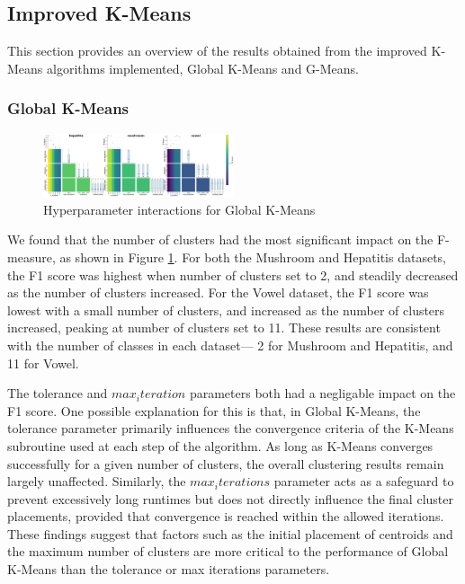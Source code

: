 \subsection{Improved K-Means}
\label{subsec:improvedkmeansresults}

This section provides an overview of the results obtained from the improved K-Means algorithms implemented, Global K-Means and G-Means.

\subsubsection{Global K-Means}
\label{subsec:globalkmeansresults}

\begin{figure}[h!]
    \centering
    \includegraphics[width=0.5\textwidth]{figures/interactions_global_kmeans.png}
    \caption{Hyperparameter interactions for Global K-Means}
    \label{fig:interactions-global-kmeans}
\end{figure}

We found that the number of clusters had the most significant impact on the F-measure, as shown in Figure \ref{fig:interactions-global-kmeans}. For both the Mushroom and Hepatitis datasets, the F1 score was
highest when number of clusters set to 2, and steadily decreased as the number of clusters increased. For the Vowel dataset, the F1 score was lowest
with a small number of clusters, and increased as the number of clusters increased, peaking at number of clusters set to 11.
These results are consistent with the number of classes in each dataset— 2 for Mushroom and Hepatitis, and 11 for Vowel.

The tolerance and $max_iteration$ parameters both had a negligable impact on the F1 score.
One possible explanation for this is that, in Global K-Means, the tolerance parameter primarily
influences the convergence criteria of the K-Means subroutine used at each step of the algorithm.
As long as K-Means converges successfully for a given number of clusters, the overall clustering
results remain largely unaffected. Similarly, the $max_iterations$ parameter acts as a safeguard to prevent
excessively long runtimes but does not directly influence the final cluster placements, provided that
convergence is reached within the allowed iterations. These findings suggest that factors such as
the initial placement of centroids and the maximum number of clusters are more critical to the
performance of Global K-Means than the tolerance or max iterations parameters.

